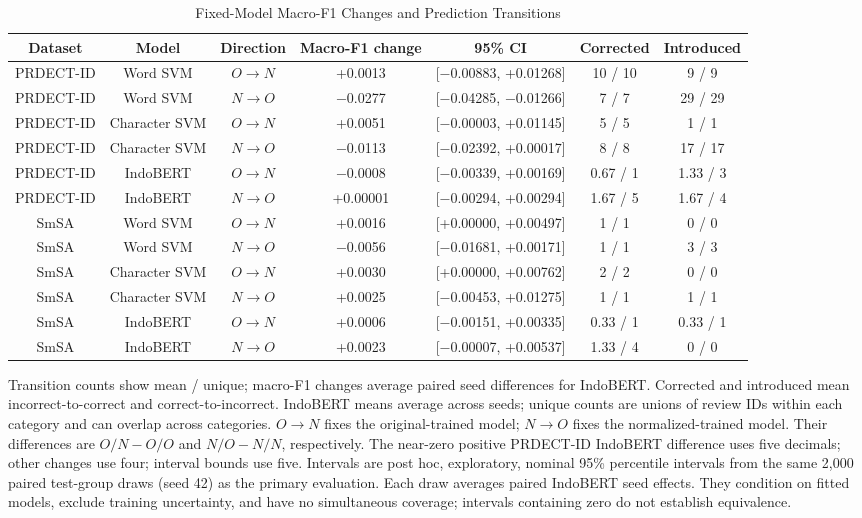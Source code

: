 \documentclass[conference]{IEEEtran}
\begin{document}
\begin{table}[t]
\caption{Fixed-Model Macro-F1 Changes and Prediction Transitions}
\centering\small
\renewcommand{\arraystretch}{1.18}
\setlength{\tabcolsep}{4pt}
\begin{tabular}{|c|c|c|c|c|c|c|}
\hline
\textbf{Dataset} & \textbf{Model} & \textbf{Direction} & \textbf{Macro-F1 change} & \textbf{95\% CI} & \textbf{Corrected} & \textbf{Introduced} \\
\hline
PRDECT-ID & Word SVM & $O\to N$ & +0.0013 & [$-$0.00883, +0.01268] & 10 / 10 & 9 / 9 \\
\hline
PRDECT-ID & Word SVM & $N\to O$ & $-$0.0277 & [$-$0.04285, $-$0.01266] & 7 / 7 & 29 / 29 \\
\hline
PRDECT-ID & Character SVM & $O\to N$ & +0.0051 & [$-$0.00003, +0.01145] & 5 / 5 & 1 / 1 \\
\hline
PRDECT-ID & Character SVM & $N\to O$ & $-$0.0113 & [$-$0.02392, +0.00017] & 8 / 8 & 17 / 17 \\
\hline
PRDECT-ID & IndoBERT & $O\to N$ & $-$0.0008 & [$-$0.00339, +0.00169] & 0.67 / 1 & 1.33 / 3 \\
\hline
PRDECT-ID & IndoBERT & $N\to O$ & +0.00001 & [$-$0.00294, +0.00294] & 1.67 / 5 & 1.67 / 4 \\
\hline
SmSA & Word SVM & $O\to N$ & +0.0016 & [+0.00000, +0.00497] & 1 / 1 & 0 / 0 \\
\hline
SmSA & Word SVM & $N\to O$ & $-$0.0056 & [$-$0.01681, +0.00171] & 1 / 1 & 3 / 3 \\
\hline
SmSA & Character SVM & $O\to N$ & +0.0030 & [+0.00000, +0.00762] & 2 / 2 & 0 / 0 \\
\hline
SmSA & Character SVM & $N\to O$ & +0.0025 & [$-$0.00453, +0.01275] & 1 / 1 & 1 / 1 \\
\hline
SmSA & IndoBERT & $O\to N$ & +0.0006 & [$-$0.00151, +0.00335] & 0.33 / 1 & 0.33 / 1 \\
\hline
SmSA & IndoBERT & $N\to O$ & +0.0023 & [$-$0.00007, +0.00537] & 1.33 / 4 & 0 / 0 \\
\hline
\end{tabular}
\par\vspace{3pt}\raggedright\small Transition counts show mean / unique; macro-F1 changes average paired seed differences for IndoBERT. Corrected and introduced mean incorrect-to-correct and correct-to-incorrect. IndoBERT means average across seeds; unique counts are unions of review IDs within each category and can overlap across categories. $O\to N$ fixes the original-trained model; $N\to O$ fixes the normalized-trained model. Their differences are $O/N-O/O$ and $N/O-N/N$, respectively. The near-zero positive PRDECT-ID IndoBERT difference uses five decimals; other changes use four; interval bounds use five. Intervals are post hoc, exploratory, nominal 95\% percentile intervals from the same 2,000 paired test-group draws (seed 42) as the primary evaluation. Each draw averages paired IndoBERT seed effects. They condition on fitted models, exclude training uncertainty, and have no simultaneous coverage; intervals containing zero do not establish equivalence.
\end{table}
\end{document}

